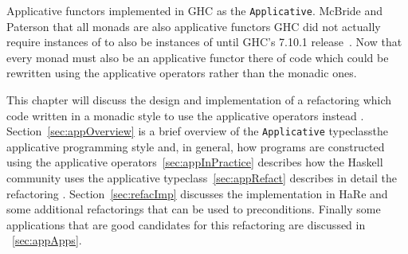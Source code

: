 Applicative functors \DIFdelbegin {}\DIFdelend \DIFaddbegin {}\DIFaddend implemented in GHC as the \DIFdelbegin {}\DIFdelend \DIFaddbegin {}\DIFaddend \texttt{Applicative}. \DIFdelbegin {}\DIFdelend \DIFaddbegin {}\DIFaddend McBride and Paterson \DIFdelbegin {}\DIFdelend \DIFaddbegin {}\DIFaddend that all monads are also applicative functors \DIFdelbegin {}\DIFdelend \DIFaddbegin {}\DIFaddend GHC did not actually require instances of \DIFdelbegin {}\DIFdelend \DIFaddbegin \texttt{} \DIFaddend to also be instances of \DIFdelbegin {}\DIFdelend \DIFaddbegin \texttt{} \DIFaddend until GHC's 7.10.1 release~\citep{ghc7.10Release}. Now that every monad must also be an applicative functor there \DIFdelbegin {}\DIFdelend \DIFaddbegin {}\DIFaddend of code which could \DIFaddbegin {}\DIFaddend be rewritten using the applicative operators rather than the monadic ones. 

This chapter will discuss the design and implementation of a refactoring which \DIFdelbegin {}\DIFdelend \DIFaddbegin {}\DIFaddend code written in a monadic style to use the applicative operators instead \DIFaddbegin {}\DIFaddend . Section~\ref{sec:appOverview} is a brief overview of the \DIFaddbegin {}\DIFaddend \texttt{Applicative} typeclass\DIFdelbegin {}\DIFdelend \DIFaddbegin {}\DIFaddend the applicative programming style and, in general, how programs are constructed using the applicative operators\DIFdelbegin {}\DIFdelend \DIFaddbegin {}\DIFaddend ~\ref{sec:appInPractice} describes how the Haskell community uses the applicative typeclass\DIFdelbegin {}\DIFdelend \DIFaddbegin {}\DIFaddend ~\ref{sec:appRefact} describes in detail the refactoring \DIFaddbegin {}\DIFaddend . Section~\ref{sec:refacImp} discusses the \DIFdelbegin {}\DIFdelend \DIFaddbegin {}\DIFaddend implementation in HaRe and some additional refactorings that can be used to \DIFdelbegin {}\DIFdelend \DIFaddbegin {}\DIFaddend preconditions. Finally some applications that are good candidates for this refactoring are discussed in \DIFdelbegin {}\DIFdelend \DIFaddbegin {}\DIFaddend ~\ref{sec:appApps}.

